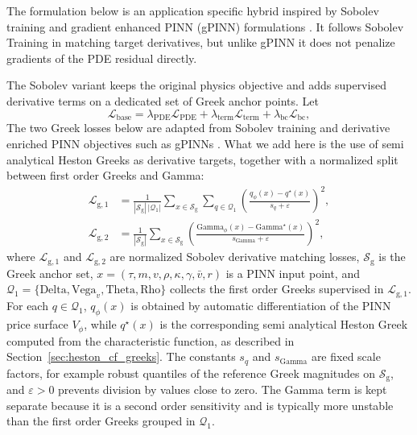 The formulation below is an application specific hybrid inspired by Sobolev training \cite{czarnecki2017sobolev} and gradient enhanced PINN (gPINN) formulations \cite{yu2022gpinn}. It follows Sobolev Training in matching target derivatives, but unlike gPINN it does not penalize gradients of the PDE residual directly.

The Sobolev variant keeps the original physics objective and adds supervised derivative terms on a dedicated set of Greek anchor points. Let
\[
\mathcal{L}_{\mathrm{base}}
=
\lambda_{\mathrm{PDE}}\mathcal{L}_{\mathrm{PDE}}
+\lambda_{\mathrm{term}}\mathcal{L}_{\mathrm{term}}
+\lambda_{\mathrm{bc}}\mathcal{L}_{\mathrm{bc}},
\]
The two Greek losses below are adapted from Sobolev training \cite{czarnecki2017sobolev} and derivative enriched PINN objectives such as gPINNs \cite{yu2022gpinn}. What we add here is the use of semi analytical Heston Greeks as derivative targets, together with a normalized split between first order Greeks and Gamma:
\begin{align}
\mathcal{L}_{\mathrm{g},1}
&=
\frac{1}{|\mathcal{S}_{\mathrm{g}}|\,|\mathcal{Q}_1|}
\sum_{x\in\mathcal{S}_{\mathrm{g}}}
\sum_{q\in\mathcal{Q}_1}
\left(
\frac{q_{\phi}(x)-q^{\star}(x)}{s_q+\varepsilon}
\right)^2,\\
\mathcal{L}_{\mathrm{g},2}
&=
\frac{1}{|\mathcal{S}_{\mathrm{g}}|}
\sum_{x\in\mathcal{S}_{\mathrm{g}}}
\left(
\frac{\mathrm{Gamma}_{\phi}(x)-\mathrm{Gamma}^{\star}(x)}{s_{\mathrm{Gamma}}+\varepsilon}
\right)^2,
\end{align}
where \(\mathcal{L}_{\mathrm{g},1}\) and \(\mathcal{L}_{\mathrm{g},2}\) are normalized Sobolev derivative matching losses, \(\mathcal{S}_{\mathrm{g}}\) is the Greek anchor set, \(x=(\tau,m,v,\rho,\kappa,\gamma,\bar v,r)\) is a PINN input point, and \(\mathcal{Q}_1=\{\mathrm{Delta},\mathrm{Vega}_{v},\mathrm{Theta},\mathrm{Rho}\}\) collects the first order Greeks supervised in \(\mathcal{L}_{\mathrm{g},1}\). For each \(q\in\mathcal{Q}_1\), \(q_{\phi}(x)\) is obtained by automatic differentiation of the PINN price surface \(V_\phi\), while \(q^{\star}(x)\) is the corresponding semi analytical Heston Greek computed from the characteristic function, as described in Section~\ref{sec:heston_cf_greeks}. The constants \(s_q\) and \(s_{\mathrm{Gamma}}\) are fixed scale factors, for example robust quantiles of the reference Greek magnitudes on \(\mathcal{S}_{\mathrm{g}}\), and \(\varepsilon>0\) prevents division by values close to zero. The Gamma term is kept separate because it is a second order sensitivity and is typically more unstable than the first order Greeks grouped in \(\mathcal{Q}_1\).

